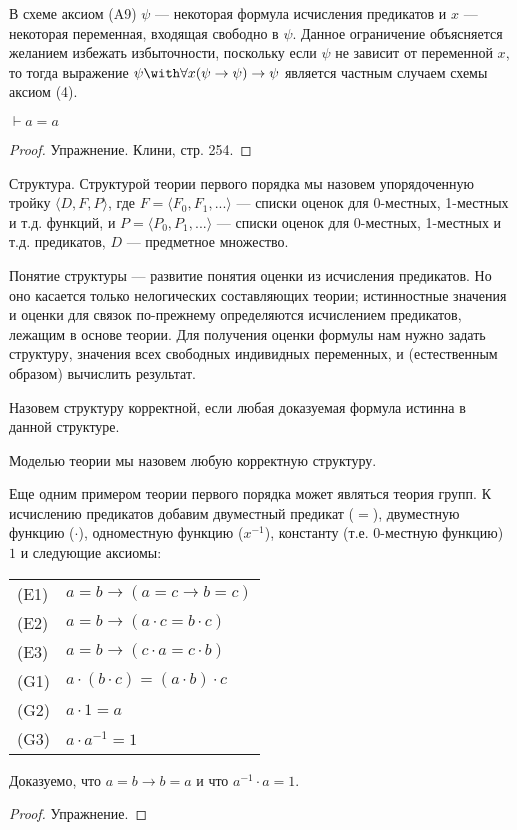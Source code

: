 В схеме аксиом (A9) $\psi$ --- некоторая формула исчисления предикатов и $x$ --- некоторая
переменная, входящая свободно в $\psi$. Данное ограничение объясняется желанием избежать
избыточности, поскольку если $\psi$ не зависит от переменной $x$, то тогда выражение 
$\psi \with \forall{x}(\psi\rightarrow\psi) \rightarrow \psi$ является частным случаем схемы 
аксиом (4).

\begin{theorem}
$\vdash a = a$
\end{theorem}
\begin{proof}
Упражнение. Клини, стр. 254.
\end{proof}

\begin{definition}{Структура.} 
Структурой теории первого порядка мы назовем упорядоченную тройку $\langle{}D, F, P\rangle$,
где $F = \langle{}F_0, F_1, ... \rangle$ --- списки оценок для 0-местных, 1-местных и т.д. функций, 
и $P = \langle{}P_0, P_1, ... \rangle$ --- списки оценок для 0-местных, 1-местных и т.д. предикатов,
$D$ --- предметное множество. 
\end{definition}

Понятие структуры --- развитие понятия оценки из исчисления предикатов. Но оно касается 
только нелогических составляющих теории; истинностные значения и оценки для связок по-прежнему
определяются исчислением предикатов, лежащим в основе теории.
Для получения оценки формулы нам нужно задать структуру, значения всех свободных
индивидных переменных, и (естественным образом) вычислить результат.

\begin{definition}
Назовем структуру корректной, если любая доказуемая формула истинна в данной структуре.
\end{definition}

\begin{definition}Моделью теории мы назовем любую корректную структуру.\end{definition}

Еще одним примером теории первого порядка может являться теория групп.
К исчислению предикатов добавим двуместный предикат ($=$), 
двуместную функцию ($\cdot$), одноместную функцию ($x^{-1}$), константу (т.е. 0-местную функцию) $1$
и следующие аксиомы:

\begin{tabular}{ll}
(E1) & $a = b \rightarrow (a = c \rightarrow b = c)$\\
(E2) & $a = b \rightarrow (a \cdot c = b \cdot c)$\\
(E3) & $a = b \rightarrow (c \cdot a = c \cdot b)$\\
(G1) & $a \cdot (b \cdot c) = (a \cdot b) \cdot c$\\
(G2) & $a \cdot 1 = a$\\
(G3) & $a \cdot a ^ {-1} = 1$
\end{tabular}

\begin{theorem}Доказуемо, что $a=b \rightarrow b=a$ и что $a^{-1} \cdot a = 1$.
\end{theorem}
\begin{proof} Упражнение. \end{proof}

